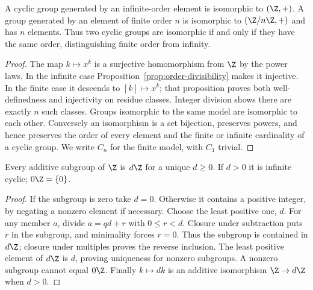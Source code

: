 \begin{theorem}\label{thm:cyclic-models}
A cyclic group generated by an infinite-order element is isomorphic to $(\Z,+)$. A group generated by an element of finite order $n$ is isomorphic to $(\Z/n\Z,+)$ and has $n$ elements. Thus two cyclic groups are isomorphic if and only if they have the same order, distinguishing finite order from infinity.
\end{theorem}
\begin{proof}
The map $k\mapsto x^k$ is a surjective homomorphism from $\Z$ by the power laws. In the infinite case Proposition~\ref{prop:order-divisibility} makes it injective. In the finite case it descends to $[k]\mapsto x^k$; that proposition proves both well-definedness and injectivity on residue classes. Integer division shows there are exactly $n$ such classes. Groups isomorphic to the same model are isomorphic to each other. Conversely an isomorphism is a set bijection, preserves powers, and hence preserves the order of every element and the finite or infinite cardinality of a cyclic group. We write $C_n$ for the finite model, with $C_1$ trivial.
\end{proof}

\begin{proposition}\label{prop:integer-subgroups}
Every additive subgroup of $\Z$ is $d\Z$ for a unique $d\geq0$. If $d>0$ it is infinite cyclic; $0\Z=\{0\}$.
\end{proposition}
\begin{proof}
If the subgroup is zero take $d=0$. Otherwise it contains a positive integer, by negating a nonzero element if necessary. Choose the least positive one, $d$. For any member $a$, divide $a=qd+r$ with $0\leq r<d$. Closure under subtraction puts $r$ in the subgroup, and minimality forces $r=0$. Thus the subgroup is contained in $d\Z$; closure under multiples proves the reverse inclusion. The least positive element of $d\Z$ is $d$, proving uniqueness for nonzero subgroups. A nonzero subgroup cannot equal $0\Z$. Finally $k\mapsto dk$ is an additive isomorphism $\Z\to d\Z$ when $d>0$.
\end{proof}

